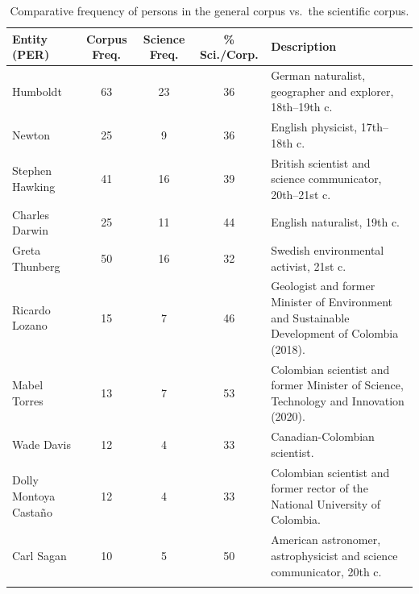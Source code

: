 \documentclass[pdflatex,sn-mathphys-num,iicol]{sn-jnl}
\begin{document}
	\begin{table}[h!]
		\caption{Comparative frequency of persons in the general corpus vs.\ the scientific corpus.}
		\label{tab:ents_per}
		{\footnotesize
			\begin{tabular}{@{}p{2.8cm}cccP{5cm}@{}}
				\toprule
				\textbf{Entity (PER)} & \textbf{Corpus Freq.} & \textbf{Science Freq.} & \textbf{\% Sci./Corp.} & \textbf{Description} \\
				\midrule
				Humboldt              & 63 & 23 & 36 & German naturalist, geographer and explorer, 18th--19th c. \\
				Newton                & 25 & 9  & 36 & English physicist, 17th--18th c. \\
				Stephen Hawking       & 41 & 16 & 39 & British scientist and science communicator, 20th--21st c. \\
				Charles Darwin        & 25 & 11 & 44 & English naturalist, 19th c. \\
				Greta Thunberg        & 50 & 16 & 32 & Swedish environmental activist, 21st c. \\
				Ricardo Lozano        & 15 & 7  & 46 & Geologist and former Minister of Environment and Sustainable Development of Colombia (2018). \\
				Mabel Torres          & 13 & 7  & 53 & Colombian scientist and former Minister of Science, Technology and Innovation (2020). \\
				Wade Davis            & 12 & 4  & 33 & Canadian-Colombian scientist. \\
				Dolly Montoya Casta{\~n}o & 12 & 4 & 33 & Colombian scientist and former rector of the National University of Colombia. \\
				Carl Sagan            & 10 & 5  & 50 & American astronomer, astrophysicist and science communicator, 20th c. \\
				\botrule
			\end{tabular}
		}
	\end{table}
	
\end{document}
